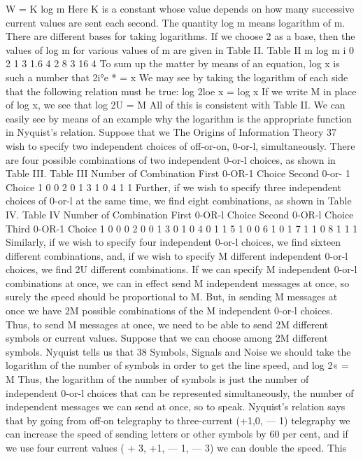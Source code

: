 W = K log m
Here K is a constant whose value depends on how many successive
current values are sent each second. The quantity log m means
logarithm of m. There are different bases for taking logarithms. If
we choose 2 as a base, then the values of log m for various values
of m are given in Table II.
Table II
m log m
i 0
2 1
3 1.6
4 2
8 3
16 4
To sum up the matter by means of an equation, log x is such a
number that
2i°e * = x
We may see by taking the logarithm of each side that the following
relation must be true:
log 2loe x = log x
If we write M in place of log x, we see that
log 2U = M
All of this is consistent with Table II.
We can easily see by means of an example why the logarithm is
the appropriate function in Nyquist’s relation. Suppose that we
The Origins of Information Theory
37
wish to specify two independent choices of off-or-on, 0-or-l, simultaneously.
There are four possible combinations of two independent
0-or-l choices, as shown in Table III.
Table III
Number of Combination First 0-OR-1
Choice
Second 0-or- 1
Choice
1 0 0
2 0 1
3 1 0
4 1 1
Further, if we wish to specify three independent choices of 0-or-l
at the same time, we find eight combinations, as shown in Table IV.
Table IV
Number of Combination First 0-OR-l
Choice
Second 0-OR-l
Choice
Third 0-OR-1
Choice
1 0 0 0
2 0 0 1
3 0 1 0
4 0 1 1
5 1 0 0
6 1 0 1
7 1 1 0
8 1 1 1
Similarly, if we wish to specify four independent 0-or-l choices,
we find sixteen different combinations, and, if we wish to specify
M different independent 0-or-l choices, we find 2U different
combinations.
If we can specify M independent 0-or-l combinations at once,
we can in effect send M independent messages at once, so surely
the speed should be proportional to M. But, in sending M messages
at once we have 2M possible combinations of the M independent
0-or-l choices. Thus, to send M messages at once, we need to be
able to send 2M different symbols or current values. Suppose that
we can choose among 2M different symbols. Nyquist tells us that
38
Symbols, Signals and Noise
we should take the logarithm of the number of symbols in order
to get the line speed, and
log 2« = M
Thus, the logarithm of the number of symbols is just the number
of independent 0-or-l choices that can be represented simultaneously,
the number of independent messages we can send at once,
so to speak.
Nyquist’s relation says that by going from off-on telegraphy to
three-current (+1,0, — 1) telegraphy we can increase the speed of
sending letters or other symbols by 60 per cent, and if we use four
current values ( + 3, +1, — 1, — 3) we can double the speed. This
